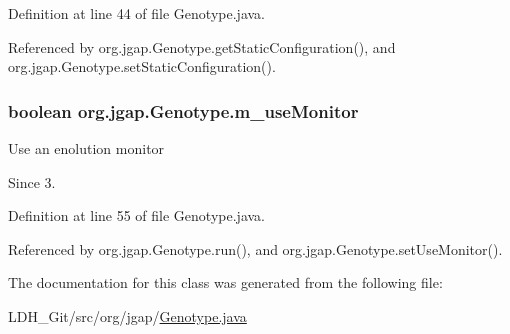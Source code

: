 Definition at line 44 of file Genotype.\-java.



Referenced by org.\-jgap.\-Genotype.\-get\-Static\-Configuration(), and org.\-jgap.\-Genotype.\-set\-Static\-Configuration().

\hypertarget{classorg_1_1jgap_1_1_genotype_ab1b1b976deab7f2faea463d1b8d52abe}{
\subsubsection[{m\-\_\-use\-Monitor}]{\setlength{\rightskip}{0pt plus 5cm}boolean org.\-jgap.\-Genotype.\-m\-\_\-use\-Monitor\hspace{0.3cm}{\ttfamily [private]}}}\label{classorg_1_1jgap_1_1_genotype_ab1b1b976deab7f2faea463d1b8d52abe}
Use an enolution monitor \begin{DoxySince}{Since}
3. 
\end{DoxySince}


Definition at line 55 of file Genotype.\-java.



Referenced by org.\-jgap.\-Genotype.\-run(), and org.\-jgap.\-Genotype.\-set\-Use\-Monitor().



The documentation for this class was generated from the following file\-:\begin{DoxyCompactItemize}
\item 
L\-D\-H\-\_\-\-Git/src/org/jgap/\hyperlink{_genotype_8java}{Genotype.\-java}\end{DoxyCompactItemize}
